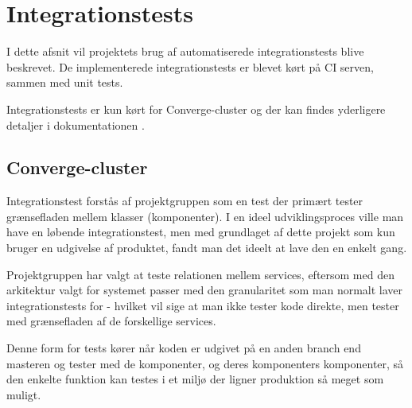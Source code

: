 \section{Integrationstests}

I dette afsnit vil projektets brug af automatiserede integrationstests blive beskrevet. De implementerede integrationstests er blevet kørt på CI serven, sammen med unit tests.

Integrationstests er kun kørt for Converge-cluster og der kan findes yderligere detaljer i dokumentationen \cite{Integrations-test}.


\subsection{Converge-cluster}

Integrationstest forstås af projektgruppen som en test der primært tester grænsefladen mellem klasser (komponenter). I en ideel udviklingsproces ville man have en løbende integrationstest, men med grundlaget af dette projekt som kun bruger en udgivelse af produktet, fandt man det ideelt at lave den en enkelt gang.

Projektgruppen har valgt at teste relationen mellem services, eftersom med den arkitektur valgt for systemet passer med den granularitet som man normalt laver integrationstests for - hvilket vil sige at man ikke tester kode direkte, men tester med grænsefladen af de forskellige services.

Denne form for tests kører når koden er udgivet på en anden branch end masteren og tester med de komponenter, og deres komponenters komponenter, så den enkelte funktion kan testes i et miljø der ligner produktion så meget som muligt.
